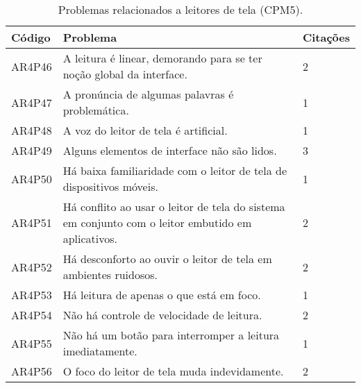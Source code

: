 \begin{table}[htb]
  \begin{center}
    \ABNTEXfontereduzida
    \caption{Problemas relacionados a leitores de tela (CPM5).}
    \label{tab-pro-lei-tel-1}
    \begin{tabular}{p{1.2cm}|p{12.0cm}|p{1.4cm}}
      \textbf{Código} & \textbf{Problema}                                                                                 & \textbf{Citações} \\
      \hline
      AR4P46          & A leitura é linear, demorando para se ter noção global da interface.                              & 2                 \\
      \hline
      AR4P47          & A pronúncia de algumas palavras é problemática.                                                   & 1                 \\
      \hline
      AR4P48          & A voz do leitor de tela é artificial.                                                             & 1                 \\
      \hline
      AR4P49          & Alguns elementos de interface não são lidos.                                                      & 3                 \\
      \hline
      AR4P50          & Há baixa familiaridade com o leitor de tela de dispositivos móveis.                               & 1                 \\
      \hline
      AR4P51          & Há conflito ao usar o leitor de tela do sistema em conjunto com o leitor embutido em aplicativos. & 2                 \\
      \hline
      AR4P52          & Há desconforto ao ouvir o leitor de tela em ambientes ruidosos.                                   & 2                 \\
      \hline
      AR4P53          & Há leitura de apenas o que está em foco.                                                          & 1                 \\
      \hline
      AR4P54          & Não há controle de velocidade de leitura.                                                         & 2                 \\
      \hline
      AR4P55          & Não há um botão para interromper a leitura imediatamente.                                         & 1                 \\
      \hline
      AR4P56          & O foco do leitor de tela muda indevidamente.                                                      & 2                 \\

\end{tabular}
\end{center}
\end{table}
